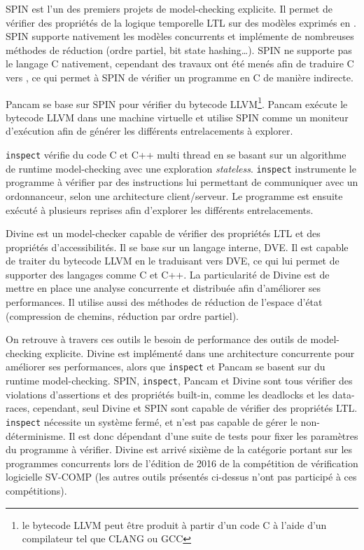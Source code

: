 SPIN\cite{SPIN} est l'un des premiers projets de model-checking
explicite. Il permet de vérifier des propriétés de la logique temporelle
\ac{LTL} sur des modèles exprimés en . SPIN supporte nativement
les modèles concurrents et implémente de nombreuses méthodes de réduction
(ordre partiel, bit state hashing\dots). SPIN ne supporte pas le langage
C nativement, cependant des travaux ont été menés afin de traduire C
vers \cite{jiang_C_to_Promela}, ce qui permet à SPIN de
vérifier un programme en C de manière indirecte.

Pancam\cite{Pancam} se base sur SPIN pour vérifier du bytecode
LLVM\footnote{le bytecode LLVM peut être produit à partir d'un code C à
  l'aide d'un compilateur tel que CLANG ou GCC}. Pancam exécute le
bytecode LLVM dans une machine virtuelle et utilise SPIN comme un
moniteur d'exécution afin de générer les différents entrelacements à
explorer.

\texttt{inspect}\cite{inspect} vérifie du code C et C++
multi thread en se basant sur un algorithme de runtime model-checking
avec une exploration \emph{stateless}. \texttt{inspect} instrumente
le programme à vérifier par des instructions lui permettant de
communiquer avec un ordonnanceur, selon une architecture client/serveur.
Le programme est ensuite exécuté à plusieurs reprises afin d'explorer les
différents entrelacements.

Divine\cite{Divine_3_0} est un model-checker capable de vérifier des
propriétés \ac{LTL} et des propriétés d'accessibilités. Il se base sur un
langage interne, DVE. Il est capable de traiter du bytecode LLVM en le
traduisant vers DVE, ce qui lui permet de supporter des langages comme C
et C++. La particularité de Divine est de mettre en place une analyse
concurrente et distribuée afin d'améliorer ses performances. Il utilise
aussi des méthodes de réduction de l'espace d'état (compression de
chemins, réduction par ordre partiel).

On retrouve à travers ces outils le besoin de performance des outils de
model-checking explicite. Divine est implémenté dans une architecture
concurrente pour améliorer ses performances, alors que \texttt{inspect} et
Pancam se basent sur du runtime model-checking. SPIN, \texttt{inspect},
Pancam et Divine sont tous vérifier des violations d'assertions et des
propriétés built-in, comme les deadlocks et les data-races, cependant, seul
Divine et SPIN sont capable de vérifier des propriétés \ac{LTL}. \texttt{inspect}
nécessite un système fermé, et n'est pas capable de gérer le non-déterminisme.
Il est donc dépendant d'une suite de tests pour fixer les paramètres du
programme à vérifier. Divine est arrivé sixième de la catégorie portant sur les
programmes concurrents lors de l'édition de 2016 de la compétition de
vérification logicielle SV-COMP\citep{svcomp_2016_result} (les autres outils présentés
ci-dessus n'ont pas participé à ces compétitions).

